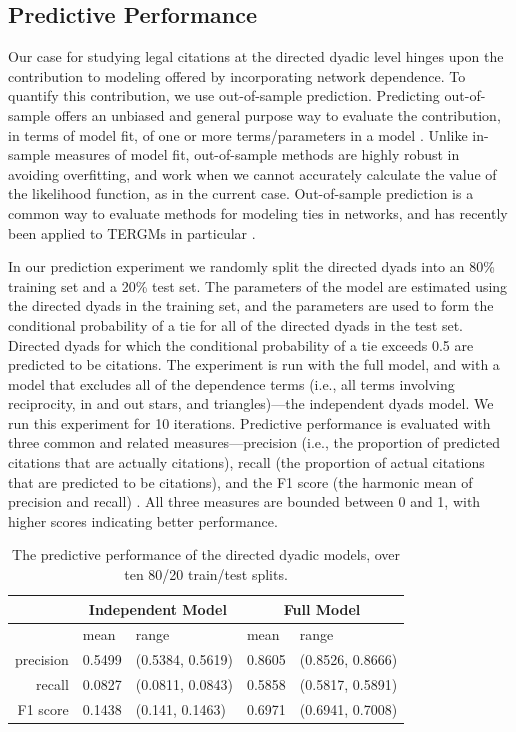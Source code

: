\documentclass[headsepline=true, abstracton]{scrartcl}
\begin{document}
\subsection{Predictive Performance}

Our case for studying legal citations at the directed dyadic level hinges upon the contribution to modeling offered by incorporating network dependence. To quantify this contribution, we use out-of-sample prediction. Predicting out-of-sample offers an unbiased and general purpose way to evaluate the contribution, in terms of model fit, of one or more terms/parameters in a model \citep{jensen2000multiple,ward2010perils}. Unlike in-sample measures of model fit, out-of-sample methods are highly robust in avoiding overfitting, and work when we cannot accurately calculate the value of the likelihood function, as in the current case. Out-of-sample prediction is a common way to evaluate methods for modeling ties in networks, and has recently been applied to TERGMs in particular \citep{desmarais2013forecasting,cranmer2017can}.

In our prediction experiment we randomly split the directed dyads into an 80\% training set and a 20\% test set. The parameters of the model are estimated using the directed dyads in the training set, and the parameters are used to form the conditional probability of a tie for all of the directed dyads in the test set. Directed dyads for which the conditional probability of a tie exceeds 0.5 are predicted to be citations. The experiment is run with the full model, and with a model that excludes all of the dependence terms (i.e., all terms involving reciprocity, in and out stars, and triangles)---the independent dyads model. We run this experiment for 10 iterations. Predictive performance is evaluated with three common and related measures---precision (i.e., the proportion of predicted citations that are actually citations), recall (the proportion of actual citations that are predicted to be citations), and the F1 score (the harmonic mean of precision and recall) \citep[see, e.g.,][for discussion of these measures]{makhoul1999performance}. All three measures are bounded between 0 and 1, with higher scores indicating better performance.

\begin{table}[ht]
\centering
\begin{tabular}{rllll}
\hline \hline
& \multicolumn{2}{c}{Independent Model} & \multicolumn{2}{c}{Full Model} \\
  \hline
 & mean & range & mean & range \\ 
  \hline
precision & 0.5499 & (0.5384, 0.5619) & 0.8605 & (0.8526, 0.8666) \\ 
  recall & 0.0827 & (0.0811, 0.0843) & 0.5858 & (0.5817, 0.5891) \\ 
  F1 score & 0.1438 & (0.141, 0.1463) & 0.6971 & (0.6941, 0.7008) \\ 
   \hline \hline
\end{tabular}
\caption{The predictive performance of the directed dyadic models, over ten 80/20 train/test splits.}
\label{tab:prediction}
\end{table}
\end{document}
